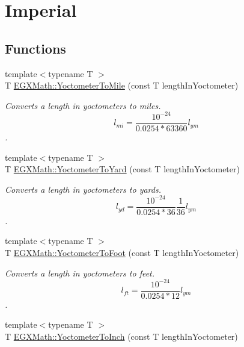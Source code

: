 \hypertarget{group___e_g_x_math-_conversions-_length_conversions-_s_i-_yoctometer-_imperial}{}\section{Imperial}
\label{group___e_g_x_math-_conversions-_length_conversions-_s_i-_yoctometer-_imperial}
\subsection*{Functions}
\begin{DoxyCompactItemize}
\item 
{\footnotesize template$<$typename T $>$ }\\T \mbox{\hyperlink{group___e_g_x_math-_conversions-_length_conversions-_s_i-_yoctometer-_imperial_gae40e8cf52937348b127013a3dbe89105}{E\+G\+X\+Math\+::\+Yoctometer\+To\+Mile}} (const T length\+In\+Yoctometer)
\begin{DoxyCompactList}\small\item\em Converts a length in yoctometers to miles. \[ l_{mi}=\frac{10^{-24}}{0.0254 * 63360} l_{ym} \]. \end{DoxyCompactList}\item 
{\footnotesize template$<$typename T $>$ }\\T \mbox{\hyperlink{group___e_g_x_math-_conversions-_length_conversions-_s_i-_yoctometer-_imperial_gaa9c695208d05175797ee88adef7bd5f2}{E\+G\+X\+Math\+::\+Yoctometer\+To\+Yard}} (const T length\+In\+Yoctometer)
\begin{DoxyCompactList}\small\item\em Converts a length in yoctometers to yards. \[ l_{yd}= \frac{10^{-24}}{0.0254 * 36} \frac{1}{36} l_{ym} \]. \end{DoxyCompactList}\item 
{\footnotesize template$<$typename T $>$ }\\T \mbox{\hyperlink{group___e_g_x_math-_conversions-_length_conversions-_s_i-_yoctometer-_imperial_gad8cb5223284af20fc0d29fefa17ec091}{E\+G\+X\+Math\+::\+Yoctometer\+To\+Foot}} (const T length\+In\+Yoctometer)
\begin{DoxyCompactList}\small\item\em Converts a length in yoctometers to feet. \[ l_{ft}= \frac{10^{-24}}{0.0254 * 12} l_{ym} \]. \end{DoxyCompactList}\item 
{\footnotesize template$<$typename T $>$ }\\T \mbox{\hyperlink{group___e_g_x_math-_conversions-_length_conversions-_s_i-_yoctometer-_imperial_gaaaba7544cf3189cd374782786a13646c}{E\+G\+X\+Math\+::\+Yoctometer\+To\+Inch}} (const T length\+In\+Yoctometer)

\end{DoxyCompactItemize}
